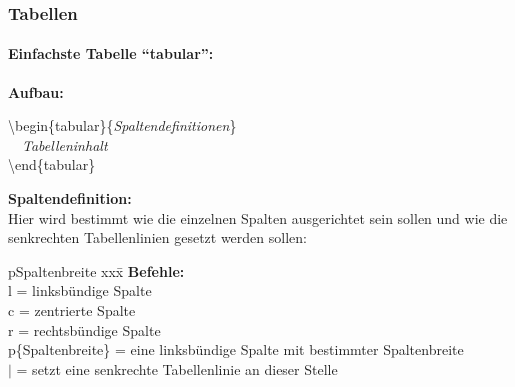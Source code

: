 \begin{frame}
\frametitle{Tabellen}
\framesubtitle{Einfachste Tabelle "`tabular"':}
\textbf{Aufbau:}\\
\begin{ttfamily}
\color{unibablueI}\textbackslash begin\color{black}\{tabular\}\{\textit{Spaltendefinitionen}\}\\
~~\textit{Tabelleninhalt}\\
\color{unibablueI}\textbackslash end\color{black}\{tabular\}\\
\end{ttfamily}

\medskip
\textbf{Spaltendefinition:}\\
Hier wird bestimmt wie die einzelnen Spalten ausgerichtet sein sollen
und wie die senkrechten Tabellenlinien gesetzt werden sollen:\\
\begin{tabbing}[H]p{Spaltenbreite}
xxx\=\kill
\textbf{Befehle:}\\
l \>= linksbündige Spalte\\
c \>= zentrierte Spalte\\
r \>= rechtsbündige Spalte\\
p\{Spaltenbreite\} \>= eine linksbündige Spalte mit bestimmter Spaltenbreite\\
\color{nounibaredI}$|$\color{black} \>= setzt eine senkrechte Tabellenlinie an
dieser Stelle\\
\end{tabbing}
\end{frame}


